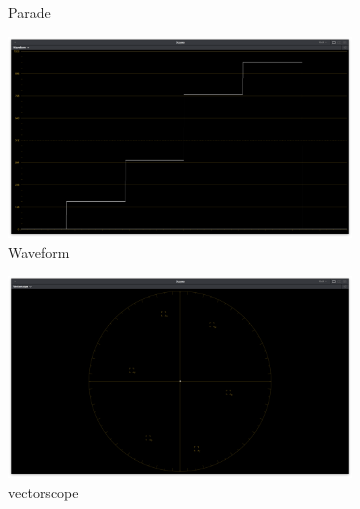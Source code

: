 \begin{figure}[ht!]
\begin{subfigure}[b]{0.475\textwidth}
            \caption[Parade]%
            {{\small Parade}}    
            \label{fig:parade-rec709}
        \end{subfigure}
        \quad
        \begin{subfigure}[b]{0.475\textwidth}   
            \centering 
            \includegraphics[width=\textwidth]{images/rec709/rec709_waveform}
            \caption[]%
            {{\small Waveform}}    
            \label{fig:wf-rec709}
        \end{subfigure}
        \begin{subfigure}[b]{0.475\textwidth}   
            \centering 
            \includegraphics[width=\textwidth]{images/rec709/rec709_vectorscope}
            \caption[]%
            {{\small vectorscope}}    
            \label{fig:vect-rec709}
        \end{subfigure}
        \quad
        \begin{subfigure}[b]{0.475\textwidth}   
            \centering 

\end{subfigure}
\end{figure}
